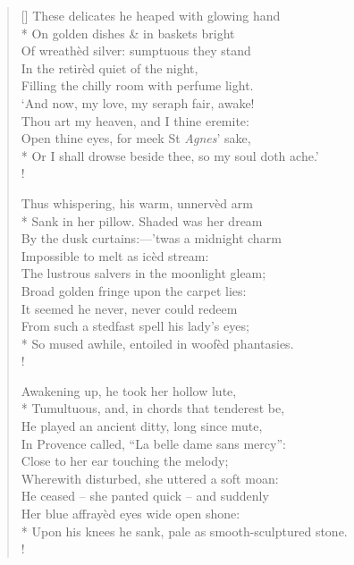\documentclass[MAIN]{subfiles}
\begin{document}
\begin{verse}[\versewidth]
\vin These delicates he heaped with glowing hand\\*
\vin On golden dishes \& in baskets bright\\
\vin Of wreath\`ed silver: sumptuous they stand\\
\vin In the retir\`ed quiet of the night,\\
\vin Filling the chilly room with perfume light.\\
\vin `And now, my love, my seraph fair, awake!\\
\vin Thou art my heaven, and I thine eremite:\\
\vin Open thine eyes, for meek St \emph{Agnes}' sake,\\*
Or I shall drowse beside thee, so my soul doth ache.'\\!

\vin Thus whispering, his warm, unnerv\`ed arm\\*
\vin Sank in her pillow. Shaded was her dream\\
\vin By the dusk curtains:—'twas a midnight charm\\
\vin Impossible to melt as ic\`ed stream:\\
\vin The lustrous salvers in the moonlight gleam;\\
\vin Broad golden fringe upon the carpet lies:\\
\vin It seemed he never, never could redeem\\
\vin From such a stedfast spell his lady's eyes;\\*
So mused awhile, entoiled in woof\`ed phantasies.\\!

\vin Awakening up, he took her hollow lute,\\*
\vin Tumultuous, and, in chords that tenderest be,\\ 
\vin He played an ancient ditty, long since mute,\\
\vin In Provence called, ``La belle dame sans mercy'':\\
\vin Close to her ear touching the melody;\\
\vin Wherewith disturbed, she uttered a soft moan:\\
\vin He ceased -- she panted quick -- and suddenly\\
\vin Her blue affray\`ed eyes wide open shone:\\*
Upon his knees he sank, pale as smooth-sculptured stone.\\!


\end{verse}
\end{document}
